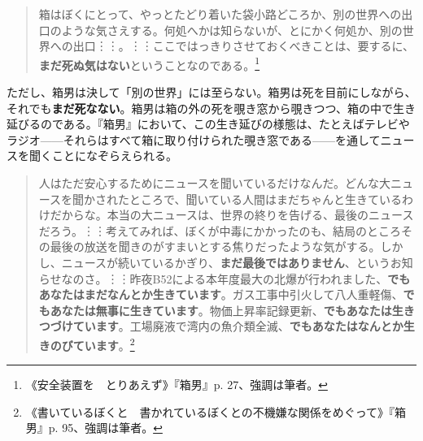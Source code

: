 \documentclass[b5j,twoside,twocolumn]{utarticle}
\begin{document}
\begin{quotation}
箱はぼくにとって、やっとたどり着いた袋小路どころか、別の世界への出口のような気さえする。何処へかは知らないが、とにかく何処か、別の世界への出口︙︙。︙︙ここではっきりさせておくべきことは、要するに、\textbf{まだ死ぬ気はない}ということなのである。\footnote{《安全装置を　とりあえず》『箱男』p. 27、強調は筆者。}
\end{quotation}

ただし、箱男は決して「別の世界」には至らない。箱男は死を目前にしながら、それでも\textbf{まだ死なない}。箱男は箱の外の死を覗き窓から覗きつつ、箱の中で生き延びるのである。『箱男』において、この生き延びの様態は、たとえばテレビやラジオ------それらはすべて箱に取り付けられた覗き窓である------を通してニュースを聞くことになぞらえられる。

\begin{quotation}
人はただ安心するためにニュースを聞いているだけなんだ。どんな大ニュースを聞かされたところで、聞いている人間はまだちゃんと生きているわけだからな。本当の大ニュースは、世界の終りを告げる、最後のニュースだろう。︙︙考えてみれば、ぼくが中毒にかかったのも、結局のところその最後の放送を聞きのがすまいとする焦りだったような気がする。しかし、ニュースが続いているかぎり、\textbf{まだ最後ではありません}、というお知らせなのさ。︙︙昨夜B52による本年度最大の北爆が行われました、\textbf{でもあなたはまだなんとか生きています}。ガス工事中引火して八人重軽傷、\textbf{でもあなたは無事に生きています}。物価上昇率記録更新、\textbf{でもあなたは生きつづけています}。工場廃液で湾内の魚介類全滅、\textbf{でもあなたはなんとか生きのびています}。\footnote{《書いているぼくと　書かれているぼくとの不機嫌な関係をめぐって》『箱男』p. 95、強調は筆者。}	
\end{quotation}
\end{document}
